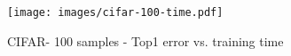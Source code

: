\documentclass{article}
\begin{document}
\begin{figure}[ht!]
\centering
\texttt{[image: images/cifar-100-time.pdf]}
\caption{CIFAR- 100 samples - Top1 error vs. training time}
\label{t-vs-err-im-CIFAR}
\end{figure}

\end{document}
